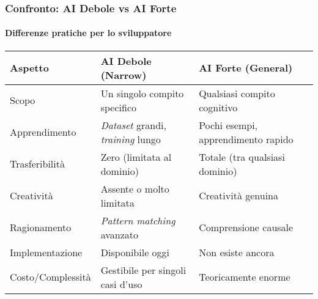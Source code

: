 \begin{frame}[t,fragile] \frametitle{Confronto: AI Debole vs AI Forte}
	{\small
		\framesubtitle{Differenze pratiche per lo sviluppatore}
		\begin{center}
		{\scriptsize
		\begin{table}
			\setlength{\tabcolsep}{4pt}
			\renewcommand{\arraystretch}{1.5}
			\centering
			\begin{tabularx}{\textwidth}{p{2cm}XX}
				\toprule
				\textbf{Aspetto} & \textbf{AI Debole (Narrow)} & \textbf{AI Forte (General)}\\
				\midrule
				Scopo & Un singolo compito specifico & Qualsiasi compito cognitivo\\
				Apprendimento & \textit{Dataset} grandi, \textit{training} lungo & Pochi esempi, apprendimento rapido\\
				Trasferibilità & Zero (limitata al dominio) & Totale (tra qualsiasi dominio)\\
				Creatività & Assente o molto limitata & Creatività genuina\\
				Ragionamento & \textit{Pattern matching} avanzato & Comprensione causale\\
				Implementazione & Disponibile oggi & Non esiste ancora\\
				Costo/Complessità & Gestibile per singoli casi d'uso & Teoricamente enorme\\
				\bottomrule
			\end{tabularx}
		\end{table}
		}
		\end{center}
	}
\end{frame}
%